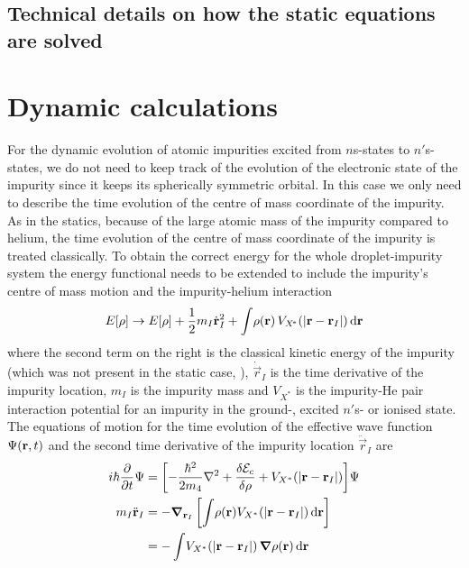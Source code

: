 	\subsection{Technical details on how the static equations are solved}

	\section{Dynamic calculations}\label{sec:td-dft}
		For the dynamic evolution of atomic impurities excited from $n$s-states to $n'$s-states, we do not need to keep track of the evolution of the electronic state of the impurity since it keeps its spherically symmetric orbital. In this case we only need to describe the time evolution of the centre of mass coordinate of the impurity. As in the statics, because of the large atomic mass of the impurity compared to helium, the time evolution of the centre of mass coordinate of the impurity is treated classically. To obtain the correct energy for the whole droplet-impurity system the energy functional needs to be extended to include the impurity's centre of mass motion and the impurity-helium interaction
		\begin{align}
			E[\rho] \rightarrow E[\rho] + \frac{1}{2}m_I\dot{\bm{\mathrm{r}}}^2_I + \int \! \rho(\bm{\mathrm{r}}) \, V_{X^{\!*}}\qty(\abs{\bm{\mathrm{r}}-\bm{\mathrm{r}}_I})\,\mathrm{d}{\bm{\mathrm{r}}} \label{eq33}
		\end{align}
		where the second term on the right is the classical kinetic energy of the impurity (which was not present in the static case, ), $\dot{\vec{r}}_I$ is the time derivative of the impurity location, $m_I$ is the impurity mass and $V_{X^{\!*}}$ is the impurity-He pair interaction potential for an impurity in the ground-, excited $n'$s- or ionised state. The equations of motion for the time evolution of the effective wave function $\Psi\qty(\bm{\mathrm{r}},t)$ and the second time derivative of the impurity location $\ddot{\vec{r}}_I$ are  
		\begin{align}
			i\hbar\frac{\partial}{\partial t} \Psi &= \qty[-\frac{\hbar^2}{2m_4} \laplacian +\frac{\delta {\cal E}_c}{\delta \rho} + V_{X^*}(|\mathbf{r}- \mathbf{r}_I|)]\Psi\nonumber\\
			m_I \ddot{\mathbf{r}}_I &= - \grad_{\vec{r}_I} \left[  \int \!\rho(\mathbf{r}) V_{X^*}(|\mathbf{r}- \mathbf{r}_I|)\diff{r}  \right] \nonumber \\
			&= -\int \! V_{X^*}(|\mathbf{r}- \mathbf{r}_I|)  \, \grad \rho(\mathbf{r})\diff{r} \label{eq34}
		\end{align}
	
